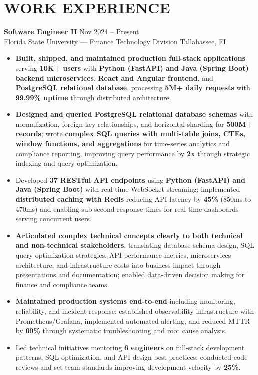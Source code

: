 \documentclass[letterpaper,10pt]{article}
\newcommand{\resumeItem}[1]{\item\small #1}
\newcommand{\resumeSubheading}[4]{
  \vspace{6pt}
  \noindent
  \textbf{#1} \hfill {\footnotesize #2} \\
  [-1pt]
  \noindent
  \small #3 \hfill {\small #4}
  \vspace{3pt}
}
\newcommand{\resumeItemsStart}{\vspace{-2pt}\begin{itemize}}
\newcommand{\resumeItemsEnd}{\end{itemize}\vspace{6pt}}
\begin{document}
\section{\textcolor{metablue}{WORK EXPERIENCE}}
\vspace{-10pt}

\resumeSubheading
{Software Engineer II}{Nov 2024 -- Present}
{Florida State University — Finance Technology Division}{Tallahassee, FL}
\resumeItemsStart
\resumeItem{\textbf{Built, shipped, and maintained production full-stack applications} serving \textbf{10K+ users} with \textbf{Python (FastAPI) and Java (Spring Boot) backend microservices}, \textbf{React and Angular frontend}, and \textbf{PostgreSQL relational database}, processing \textbf{5M+ daily requests} with \textbf{99.99\% uptime} through distributed architecture.}
\resumeItem{\textbf{Designed and queried PostgreSQL relational database schemas} with normalization, foreign key relationships, and horizontal sharding for \textbf{500M+ records}; wrote \textbf{complex SQL queries with multi-table joins, CTEs, window functions, and aggregations} for time-series analytics and compliance reporting, improving query performance by \textbf{2x} through strategic indexing and query optimization.}
\resumeItem{Developed \textbf{37 RESTful API endpoints} using \textbf{Python (FastAPI) and Java (Spring Boot)} with real-time WebSocket streaming; implemented \textbf{distributed caching with Redis} reducing API latency by \textbf{45\%} (850ms to 470ms) and enabling sub-second response times for real-time dashboards serving concurrent users.}
\resumeItem{\textbf{Articulated complex technical concepts clearly to both technical and non-technical stakeholders}, translating database schema design, SQL query optimization strategies, API performance metrics, microservices architecture, and infrastructure costs into business impact through presentations and documentation; enabled data-driven decision making for finance and compliance teams.}
\resumeItem{\textbf{Maintained production systems end-to-end} including monitoring, reliability, and incident response; established observability infrastructure with Prometheus/Grafana, implemented automated alerting, and reduced MTTR by \textbf{60\%} through systematic troubleshooting and root cause analysis.}
\resumeItem{Led technical initiatives mentoring \textbf{6 engineers} on full-stack development patterns, SQL optimization, and API design best practices; conducted code reviews and set team standards improving development velocity by \textbf{25\%}.}
\resumeItemsEnd
\vspace{-12pt}
\end{document}
